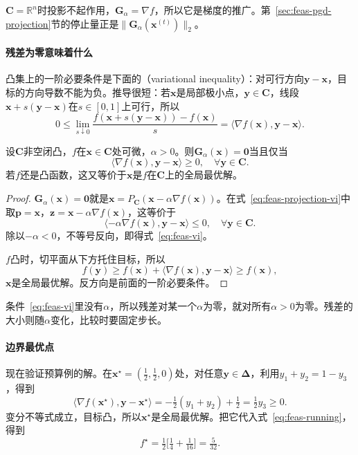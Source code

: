 $\bm{C}=\mathbb{R}^n$时投影不起作用，$\bm{G}_\alpha=\nabla f$，所以它是梯度的推广。第~\ref{sec:feas-pgd-projection}节的停止量正是$\lVert\bm{G}_\alpha(\bm{x}^{(t)})\rVert_2$。

\paragraph{残差为零意味着什么}
凸集上的一阶必要条件是下面的（variational inequality）：对可行方向$\bm{y}-\bm{x}$，目标的方向导数不能为负。推导很短：若$\bm{x}$是局部极小点，$\bm{y}\in\bm{C}$，线段$\bm{x}+s(\bm{y}-\bm{x})$在$s\in[0,1]$上可行，所以
\[
 0\leq\lim_{s\downarrow0}\frac{f(\bm{x}+s(\bm{y}-\bm{x}))-f(\bm{x})}{s}=\langle\nabla f(\bm{x}),\bm{y}-\bm{x}\rangle.
\]

\begin{theorem}[残差为零与变分不等式]
\label{thm:feas-residual}
设$\bm{C}$非空闭凸，$f$在$\bm{x}\in\bm{C}$处可微，$\alpha>0$。则$\bm{G}_\alpha(\bm{x})=\bm{0}$当且仅当
\begin{equation}
 \langle\nabla f(\bm{x}),\bm{y}-\bm{x}\rangle\geq0,\quad\forall\bm{y}\in\bm{C}.
 \label{eq:feas-vi}
\end{equation}
若$f$还是凸函数，这又等价于$\bm{x}$是$f$在$\bm{C}$上的全局最优解。
\end{theorem}

\begin{proof}
$\bm{G}_\alpha(\bm{x})=\bm{0}$就是$\bm{x}=P_{\bm{C}}(\bm{x}-\alpha\nabla f(\bm{x}))$。在式~\eqref{eq:feas-projection-vi}中取$\bm{p}=\bm{x}$，$\bm{z}=\bm{x}-\alpha\nabla f(\bm{x})$，这等价于
\[
 \langle-\alpha\nabla f(\bm{x}),\bm{y}-\bm{x}\rangle\leq0,\quad\forall\bm{y}\in\bm{C}.
\]
除以$-\alpha<0$，不等号反向，即得式~\eqref{eq:feas-vi}。

$f$凸时，切平面从下方托住目标，所以
\[
 f(\bm{y})\geq f(\bm{x})+\langle\nabla f(\bm{x}),\bm{y}-\bm{x}\rangle\geq f(\bm{x}),
\]
$\bm{x}$是全局最优解。反方向是前面的一阶必要条件。
\end{proof}

条件~\eqref{eq:feas-vi}里没有$\alpha$，所以残差对某一个$\alpha$为零，就对所有$\alpha>0$为零。残差的大小则随$\alpha$变化，比较时要固定步长。

\paragraph{边界最优点}
现在验证预算例的解。在$\bm{x}^\star=(\tfrac12,\tfrac12,0)$处，对任意$\bm{y}\in\bm{\Delta}$，利用$y_1+y_2=1-y_3$，得到
\[
 \langle\nabla f(\bm{x}^\star),\bm{y}-\bm{x}^\star\rangle
 =-\tfrac12(y_1+y_2)+\tfrac12
 =\tfrac12y_3\geq0.
\]
变分不等式成立，目标凸，所以$\bm{x}^\star$是全局最优解。把它代入式~\eqref{eq:feas-running}，得到
\[
 f^\star=\tfrac12\bigl[\tfrac14+\tfrac{1}{16}\bigr]=\tfrac{5}{32}.
\]


